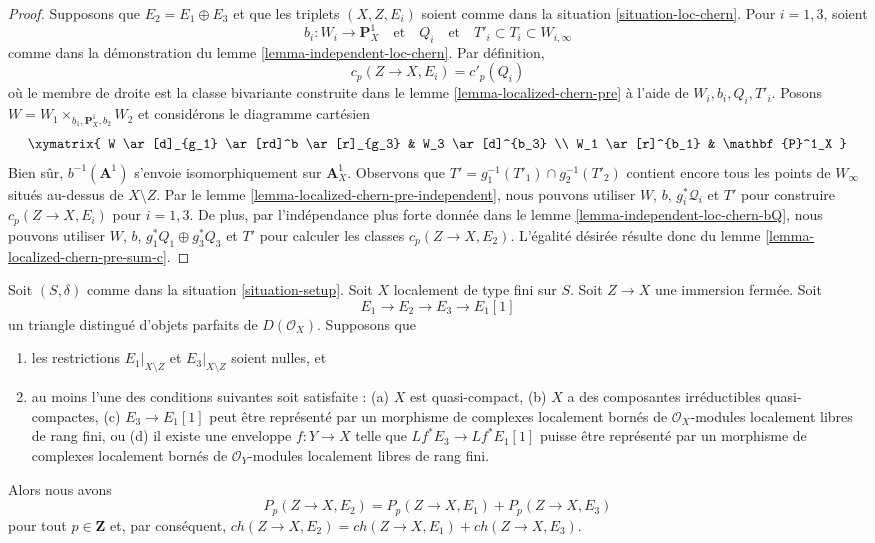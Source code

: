 \begin{proof}
\medskip\noindent
Supposons que $E_2 = E_1 \oplus E_3$ et que les triplets $(X, Z, E_i)$
soient comme dans la situation \ref{situation-loc-chern}.
Pour $i = 1, 3$, soient
$$
b_i : W_i \to \mathbf{P}^1_X
\quad\text{et}\quad
Q_i
\quad\text{et}\quad
T'_i \subset T_i \subset W_{i, \infty}
$$
comme dans la démonstration du lemme \ref{lemma-independent-loc-chern}.
Par définition,
$$
c_p(Z \to X, E_i) = c'_p(Q_i)
$$
où le membre de droite est la classe bivariante construite dans le
lemme \ref{lemma-localized-chern-pre} à l'aide de $W_i, b_i, Q_i, T'_i$.
Posons $W = W_1 \times_{b_1, \mathbf{P}^1_X, b_2} W_2$ et considérons
le diagramme cartésien
$$
\xymatrix{
W \ar[d]_{g_1} \ar[rd]^b \ar[r]_{g_3} & W_3 \ar[d]^{b_3} \\
W_1 \ar[r]^{b_1} & \mathbf{P}^1_X
}
$$
Bien sûr, $b^{-1}(\mathbf{A}^1)$ s'envoie isomorphiquement sur $\mathbf{A}^1_X$.
Observons que $T' = g_1^{-1}(T'_1) \cap g_2^{-1}(T'_2)$ contient encore
tous les points de $W_\infty$ situés au-dessus de $X \setminus Z$.
Par le lemme \ref{lemma-localized-chern-pre-independent}, nous pouvons utiliser
$W$, $b$, $g_i^*\mathcal{Q}_i$ et
$T'$ pour construire $c_p(Z \to X, E_i)$ pour $i = 1, 3$.
De plus, par l'indépendance plus forte donnée dans le
lemme \ref{lemma-independent-loc-chern-bQ}, nous pouvons utiliser
$W$, $b$, $g_1^*Q_1 \oplus g_3^*Q_3$ et $T'$
pour calculer les classes $c_p(Z \to X, E_2)$.
L'égalité désirée résulte donc du
lemme \ref{lemma-localized-chern-pre-sum-c}.
\end{proof}

\begin{lemma}
\label{lemma-additivity-loc-chern-P}
Soit $(S, \delta)$ comme dans la situation \ref{situation-setup}.
Soit $X$ localement de type fini sur $S$. Soit $Z \to X$
une immersion fermée. Soit
$$
E_1 \to E_2 \to E_3 \to E_1[1]
$$
un triangle distingué d'objets parfaits de $D(\mathcal{O}_X)$.
Supposons que
\begin{enumerate}
\item les restrictions $E_1|_{X \setminus Z}$ et $E_3|_{X \setminus Z}$
soient nulles, et
\item au moins l'une des conditions suivantes soit satisfaite :
(a) $X$ est quasi-compact,
(b) $X$ a des composantes irréductibles quasi-compactes,
(c) $E_3 \to E_1[1]$ peut être représenté par un morphisme de complexes
localement bornés de $\mathcal{O}_X$-modules localement libres de rang fini, ou
(d) il existe une enveloppe $f : Y \to X$ telle que $Lf^*E_3 \to Lf^*E_1[1]$
puisse être représenté par un morphisme de complexes localement bornés de
$\mathcal{O}_Y$-modules localement libres de rang fini.
\end{enumerate}
Alors nous avons
$$
P_p(Z \to X, E_2) = P_p(Z \to X, E_1) + P_p(Z \to X, E_3)
$$
pour tout $p \in \mathbf{Z}$ et, par conséquent,
$ch(Z \to X, E_2) = ch(Z \to X, E_1) + ch(Z \to X, E_3)$.
\end{lemma}

